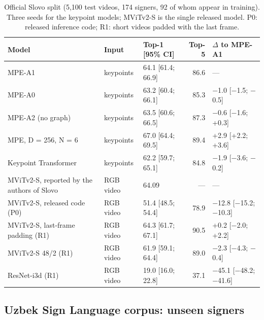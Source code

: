 \documentclass[a4paper,fleqn]{cas-dc}
\begin{document}
\begin{table}[t]
\caption{Official Slovo split (5,100 test videos, 174 signers, 92 of whom appear in training). Three seeds for the keypoint models; MViTv2-S is the single released model. P0: released inference code; R1: short videos padded with the last frame.}\label{tab:official}
\footnotesize
\centering
\begin{tabular}{lllrl}
\toprule
\textbf{Model} & \textbf{Input} & \textbf{Top-1 [95\% CI]} & \textbf{Top-5} & \textbf{$\Delta$ to MPE-A1} \\
\midrule
MPE-A1 & keypoints & 64.1 [61.4; 66.9] & 86.6 & --- \\
MPE-A0 & keypoints & 63.2 [60.4; 66.1] & 85.3 & $-$1.0 [$-$1.5; $-$0.5] \\
MPE-A2 (no graph) & keypoints & 63.5 [60.6; 66.5] & 87.3 & $-$0.6 [$-$1.6; +0.3] \\
MPE, D = 256, N = 6 & keypoints & 67.0 [64.4; 69.5] & 89.4 & +2.9 [+2.2; +3.6] \\
Keypoint Transformer & keypoints & 62.2 [59.7; 65.1] & 84.8 & $-$1.9 [$-$3.6; $-$0.2] \\
MViTv2-S, reported by the authors of Slovo & RGB video & 64.09 & --- & --- \\
MViTv2-S, released code (P0) & RGB video & 51.4 [48.5; 54.4] & 78.9 & $-$12.8 [$-$15.2; $-$10.3] \\
MViTv2-S, last-frame padding (R1) & RGB video & 64.3 [61.7; 67.1] & 90.5 & +0.2 [$-$2.0; +2.2] \\
MViTv2-S 48/2 (R1) & RGB video & 61.9 [59.1; 64.4] & 89.0 & $-$2.3 [$-$4.3; $-$0.4] \\
ResNet-i3d (R1) & RGB video & 19.0 [16.0; 22.8] & 37.1 & $-$45.1 [$-$48.2; $-$41.6] \\
\bottomrule
\end{tabular}
\end{table}

\hypertarget{uzbek-sign-language-corpus-unseen-signers}{%
\subsection{Uzbek Sign Language corpus: unseen signers}\label{uzbek-sign-language-corpus-unseen-signers}}
\end{document}
